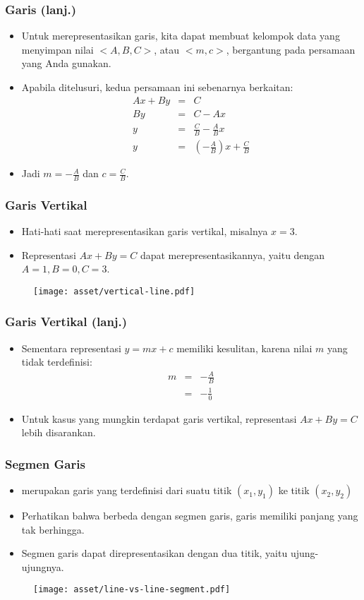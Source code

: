\begin{frame}
\frametitle{Garis (lanj.)}
\begin{itemize}
  \item Untuk merepresentasikan garis, kita dapat membuat kelompok data yang menyimpan nilai $<A, B, C>$, atau $<m, c>$, bergantung pada persamaan yang Anda gunakan. 
  \item Apabila ditelusuri, kedua persamaan ini sebenarnya berkaitan:
\begin{eqnarray*}
Ax + By &=& C \\
By &=& C - Ax \\
y &=& \frac{C}{B} - \frac{A}{B}x \\
y &=& \left(-\frac{A}{B}\right)x + \frac{C}{B} 
\end{eqnarray*}
  \item Jadi $m = -\frac{A}{B}$ dan $c = \frac{C}{B}$.
\end{itemize}
\end{frame}

\begin{frame}
\frametitle{Garis Vertikal }
\begin{itemize}
  \item Hati-hati saat merepresentasikan garis vertikal, misalnya $x = 3$.
  \item Representasi $Ax + By = C$ dapat merepresentasikannya, yaitu dengan $A=1, B=0, C=3$.
\end{itemize}
\begin{figure}
  \texttt{[image: asset/vertical-line.pdf]}
\end{figure}
\end{frame}

\begin{frame}
\frametitle{Garis Vertikal (lanj.)}
\begin{itemize}
  \item Sementara representasi $y = mx + c$ memiliki kesulitan, karena nilai $m$ yang tidak terdefinisi:
\begin{eqnarray*}
m &=& -\frac{A}{B} \\
&=& -\frac{1}{0}
\end{eqnarray*}
  \item Untuk kasus yang mungkin terdapat garis vertikal, representasi $Ax + By = C$ lebih disarankan.
\end{itemize}
\end{frame}


\begin{frame}
\frametitle{Segmen Garis}
\begin{itemize}
  \item {} merupakan garis yang terdefinisi dari suatu titik $(x_1, y_1)$ ke titik $(x_2, y_2)$
  \item Perhatikan bahwa berbeda dengan segmen garis, garis memiliki panjang yang tak berhingga.
  \item Segmen garis dapat direpresentasikan dengan dua titik, yaitu ujung-ujungnya.
\end{itemize}
\begin{figure}
  \texttt{[image: asset/line-vs-line-segment.pdf]}
\end{figure}
\end{frame}

